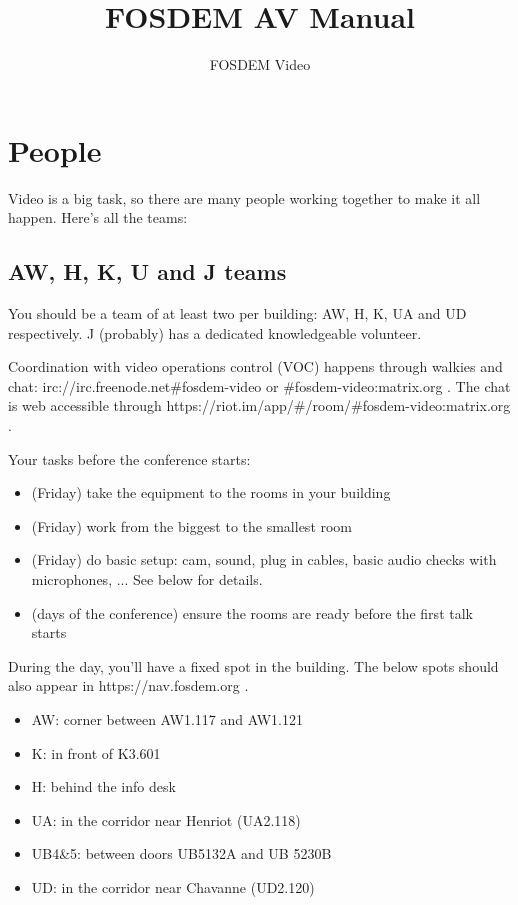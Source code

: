 \documentclass{article}
\title{FOSDEM AV Manual}
\author{FOSDEM Video}
\begin{document}
\maketitle \thispagestyle{empty}
\newpage

\tableofcontents
\newpage

\section{People}
Video is a big task, so there are many people working together to make it all happen. Here's all the teams:

\subsection{AW, H, K, U and J teams}
You should be a team of at least two per building: AW, H, K, UA and UD respectively. J (probably) has a dedicated knowledgeable volunteer.

Coordination with video operations control (VOC) happens through walkies and chat: irc://irc.freenode.net\#fosdem-video or \#fosdem-video:matrix.org . The chat is web accessible through https://riot.im/app/\#/room/\#fosdem-video:matrix.org .

Your tasks before the conference starts:
\begin{itemize}
  \item (Friday) take the equipment to the rooms in your building
  \item (Friday) work from the biggest to the smallest room
  \item (Friday) do basic setup: cam, sound, plug in cables, basic audio checks with microphones, ... See below for details.
  \item (days of the conference) ensure the rooms are ready before the first talk starts
\end{itemize}

During the day, you'll have a fixed spot in the building. The below spots should also appear in https://nav.fosdem.org .
\begin{itemize}
  \item AW: corner between AW1.117 and AW1.121
  \item K: in front of K3.601
  \item H: behind the info desk
  \item UA: in the corridor near Henriot (UA2.118)
  \item UB4\&5: between doors UB5132A and UB 5230B
  \item UD: in the corridor near Chavanne (UD2.120)
\end{itemize}
\end{document}
